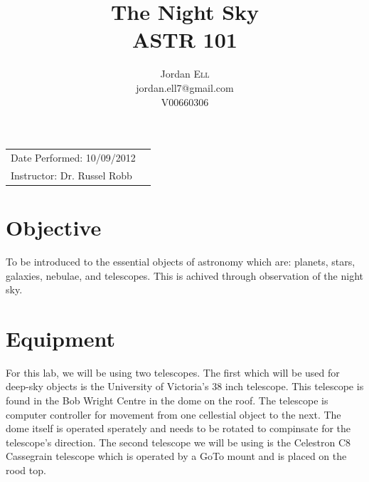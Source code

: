 \documentclass{article}
\title{The Night Sky \\ ASTR 101} %
\author{Jordan \textsc{Ell} \\ jordan.ell7@gmail.com \\ V00660306} %
\begin{document}
\maketitle %

\begin{tabular}{lr}
Date Performed: 10/09/2012\\ %
Instructor: Dr. Russel Robb %
\end{tabular}

\setlength\parindent{0pt} %

\renewcommand{\labelenumi}{\alph{enumi}.} %


\section{Objective}

To be introduced to the essential objects of astronomy which are: planets, stars, galaxies, nebulae, and telescopes. This is
achived through observation of the night sky.\\
 

\section{Equipment}

For this lab, we will be using two telescopes. The first which will be used for deep-sky objects is the University of Victoria's 
38 inch telescope. This telescope is found in the Bob Wright Centre in the dome on the roof. The telescope is computer
controller for movement from one cellestial object to the next. The dome itself is operated sperately and needs to be 
rotated to compinsate for the telescope's direction. The second telescope we will be using is the Celestron C8 Cassegrain
telescope which is operated by a GoTo mount and is placed on the rood top.\\
\end{document}
